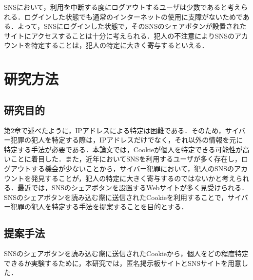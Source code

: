\documentclass[10pt, a4paper]{jreport}
\begin{document}
SNSにおいて，利用を中断する度にログアウトするユーザは少数であると考えられる．ログインした状態でも通常のインターネットの使用に支障がないためである．よって，SNSにログインした状態で，そのSNSのシェアボタンが設置されたサイトにアクセスすることは十分に考えられる．犯人の不注意によりSNSのアカウントを特定することは，犯人の特定に大きく寄与するといえる．
















\chapter{研究方法}
\section{研究目的}

第2章で述べたように，IPアドレスによる特定は困難である．そのため，サイバー犯罪の犯人を特定する際は，IPアドレスだけでなく，それ以外の情報を元に特定する手法が必要である．本論文では，Cookieが個人を特定できる可能性が高いことに着目した．また，近年においてSNSを利用するユーザが多く存在し，ログアウトする機会が少ないことから，サイバー犯罪において，犯人のSNSのアカウントを発見することが，犯人の特定に大きく寄与するのではないかと考えられる．最近では，SNSのシェアボタンを設置するWebサイトが多く見受けられる．SNSのシェアボタンを読み込む際に送信されたCookieを利用することで，サイバー犯罪の犯人を特定する手法を提案することを目的とする．

\section{提案手法}
SNSのシェアボタンを読み込む際に送信されたCookieから，個人をどの程度特定できるか実験するために，本研究では，匿名掲示板サイトとSNSサイトを用意した．
\end{document}
